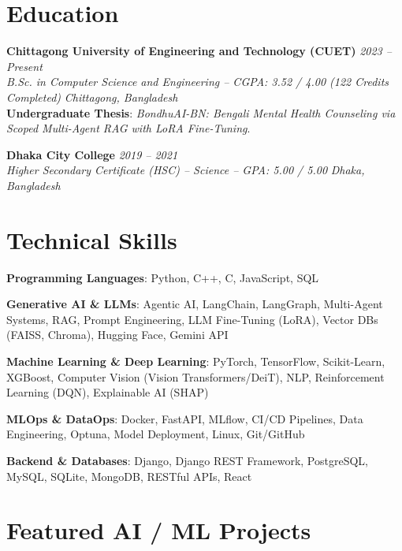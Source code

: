 \documentclass[a4paper,9.5pt]{article}
\begin{document}
\section{Education}
\vspace{1pt}
\noindent\textbf{Chittagong University of Engineering and Technology (CUET)} \hfill \textit{2023 -- Present} \\
\textit{\small B.Sc. in Computer Science and Engineering -- CGPA: 3.52 / 4.00 (122 Credits Completed)} \hfill \textit{\small Chittagong, Bangladesh} \\
\footnotesize \textbf{Undergraduate Thesis}: \textit{BondhuAI-BN: Bengali Mental Health Counseling via Scoped Multi-Agent RAG with LoRA Fine-Tuning}.

\vspace{1pt}
\noindent\textbf{Dhaka City College} \hfill \textit{2019 -- 2021} \\
\textit{\small Higher Secondary Certificate (HSC) -- Science -- GPA: 5.00 / 5.00} \hfill \textit{\small Dhaka, Bangladesh}

\section{Technical Skills}
\begin{itemize}[leftmargin=10pt, label={$\bullet$}, topsep=1pt, itemsep=1pt]
  \footnotesize{
    \item \textbf{Programming Languages}: Python, C++, C, JavaScript, SQL
    \item \textbf{Generative AI \& LLMs}: Agentic AI, LangChain, LangGraph, Multi-Agent Systems, RAG, Prompt Engineering, LLM Fine-Tuning (LoRA), Vector DBs (FAISS, Chroma), Hugging Face, Gemini API
    \item \textbf{Machine Learning \& Deep Learning}: PyTorch, TensorFlow, Scikit-Learn, XGBoost, Computer Vision (Vision Transformers/DeiT), NLP, Reinforcement Learning (DQN), Explainable AI (SHAP)
    \item \textbf{MLOps \& DataOps}: Docker, FastAPI, MLflow, CI/CD Pipelines, Data Engineering, Optuna, Model Deployment, Linux, Git/GitHub
    \item \textbf{Backend \& Databases}: Django, Django REST Framework, PostgreSQL, MySQL, SQLite, MongoDB, RESTful APIs, React
  }
\end{itemize}

\section{Featured AI / ML Projects}
\end{document}
